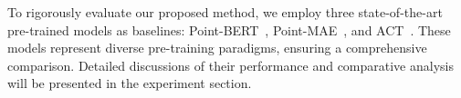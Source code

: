 To rigorously evaluate our proposed method, we employ three state-of-the-art pre-trained models as baselines: Point-BERT~\cite{yu2022point}, Point-MAE~\cite{pang2022masked}, and ACT~\cite{dong2022autoencoders}. These models represent diverse pre-training paradigms, ensuring a comprehensive comparison. Detailed discussions of their performance and comparative analysis will be presented in the experiment section.



